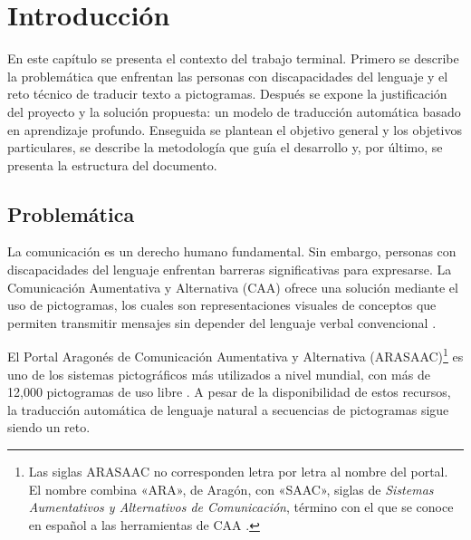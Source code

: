 \setcounter{page}{1} 

\section{Introducción}

En este capítulo se presenta el contexto del trabajo terminal. Primero se describe la problemática que enfrentan las personas con discapacidades del lenguaje y el reto técnico de traducir texto a pictogramas. Después se expone la justificación del proyecto y la solución propuesta: un modelo de traducción automática basado en aprendizaje profundo. Enseguida se plantean el objetivo general y los objetivos particulares, se describe la metodología que guía el desarrollo y, por último, se presenta la estructura del documento.

\subsection{Problemática}
La comunicación es un derecho humano fundamental. Sin embargo, personas con discapacidades del lenguaje enfrentan barreras significativas para expresarse. La Comunicación Aumentativa y Alternativa (CAA) ofrece una solución mediante el uso de pictogramas, los cuales son representaciones visuales de conceptos que permiten transmitir mensajes sin depender del lenguaje verbal convencional \cite{beukelman2013}.

El Portal Aragonés de Comunicación Aumentativa y Alternativa (ARASAAC)\footnote{Las siglas ARASAAC no corresponden letra por letra al nombre del portal. El nombre combina «ARA», de Aragón, con «SAAC», siglas de \textit{Sistemas Aumentativos y Alternativos de Comunicación}, término con el que se conoce en español a las herramientas de CAA \cite{arasaac}.} es uno de los sistemas pictográficos más utilizados a nivel mundial, con más de 12,000 pictogramas de uso libre \cite{arasaac2007}. A pesar de la disponibilidad de estos recursos, la traducción automática de lenguaje natural a secuencias de pictogramas sigue siendo un reto.

